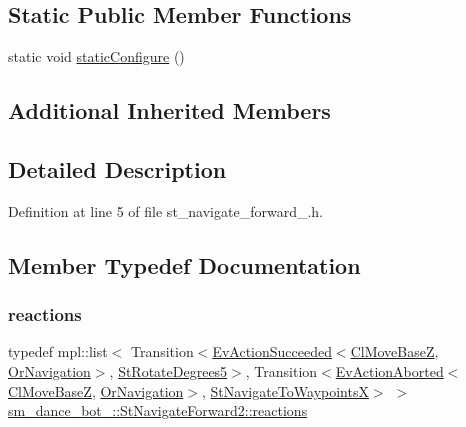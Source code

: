 \subsection*{Static Public Member Functions}
\begin{DoxyCompactItemize}
\item 
static void \hyperlink{structsm__dance__bot__2_1_1StNavigateForward2_a95f49a400b7ffb55303819076c06c3bd}{static\+Configure} ()
\end{DoxyCompactItemize}
\subsection*{Additional Inherited Members}


\subsection{Detailed Description}


Definition at line 5 of file st\+\_\+navigate\+\_\+forward\+\_.\+h.



\subsection{Member Typedef Documentation}
\mbox{\label{structsm__dance__bot__2_1_1StNavigateForward2_a1a3c17ed899e30094d36d8507af995db}} 
\subsubsection{\texorpdfstring{reactions}{reactions}}
{\footnotesize\ttfamily typedef mpl\+::list$<$ Transition$<$\hyperlink{structsmacc_1_1default__events_1_1EvActionSucceeded}{Ev\+Action\+Succeeded}$<$\hyperlink{classcl__move__base__z_1_1ClMoveBaseZ}{Cl\+Move\+BaseZ}, \hyperlink{classsm__dance__bot__2_1_1OrNavigation}{Or\+Navigation}$>$, \hyperlink{structsm__dance__bot__2_1_1StRotateDegrees5}{St\+Rotate\+Degrees5}$>$, Transition$<$\hyperlink{structsmacc_1_1default__events_1_1EvActionAborted}{Ev\+Action\+Aborted}$<$\hyperlink{classcl__move__base__z_1_1ClMoveBaseZ}{Cl\+Move\+BaseZ}, \hyperlink{classsm__dance__bot__2_1_1OrNavigation}{Or\+Navigation}$>$, \hyperlink{structsm__dance__bot__2_1_1StNavigateToWaypointsX}{St\+Navigate\+To\+WaypointsX}$>$ $>$ \hyperlink{structsm__dance__bot__2_1_1StNavigateForward2_a1a3c17ed899e30094d36d8507af995db}{sm\+\_\+dance\+\_\+bot\+\_\+::\+St\+Navigate\+Forward2\+::reactions}}



